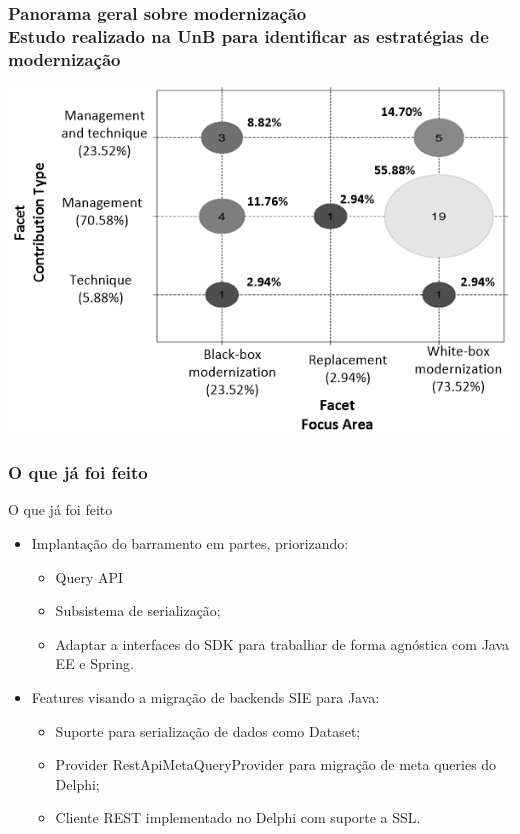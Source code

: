 \documentclass{beamer}
\begin{document}
\begin{frame}
\frametitle{Panorama geral sobre modernização  \\ \small{Estudo realizado na UnB para identificar as estratégias de modernização}}


\centering
\includegraphics[scale=0.45]{img/bubble_diagram.png}

\end{frame}






\begin{frame}
\frametitle{O que já foi feito}

\begin{exampleblock}{O que já foi feito}
	
	\begin{itemize}
		\item<1->Implantação do barramento em partes, priorizando:
			\begin{itemize}
				\item<1->Query API
				\item<1->Subsistema de serialização;
				\item<1->Adaptar a interfaces do SDK para trabalhar de forma agnóstica com Java EE e Spring. 
			\end{itemize}
		\item<1->Features visando a migração de backends SIE para Java:
			\begin{itemize}
				\item<1->Suporte para serialização de dados como Dataset;
				\item<1->Provider RestApiMetaQueryProvider para migração de meta queries do Delphi;
				\item<1->Cliente REST implementado no Delphi com suporte a SSL.
			\end{itemize}
		
	\end{itemize}
	
\end{exampleblock}


\end{frame}
\end{document}
